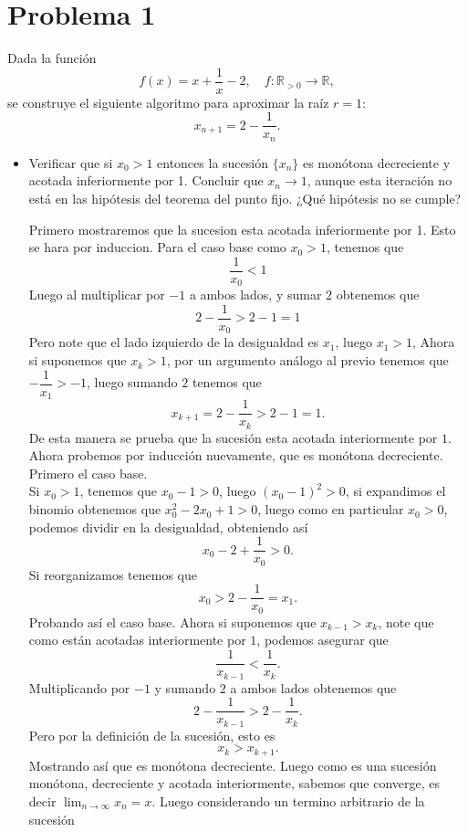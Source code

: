 
\section{Problema 1}
Dada la función
\[
f(x) = x + \frac{1}{x} - 2, \quad f: \mathbb{R}_{>0} \to \mathbb{R},
\]
se construye el siguiente algoritmo para aproximar la raíz $r = 1$:
\[
x_{n+1} = 2 - \frac{1}{x_n}.
\]

\begin{itemize}
    \item Verificar que si $x_0 > 1$ entonces la sucesión $\{x_n\}$ es monótona decreciente y acotada inferiormente por 1. Concluir que $x_n \to 1$, aunque esta iteración no está en las hipótesis del teorema del punto fijo. ¿Qué hipótesis no se cumple?
    \begin{sproof} Primero mostraremos que la sucesion esta acotada inferiormente por 1. Esto se hara por induccion. Para el caso base como $x_0>1$, tenemos que
    $$\frac{1}{x_0}<1$$
    Luego al multiplicar por $-1$ a ambos lados, y sumar $2$ obtenemos que
    $$2-\frac{1}{x_0}>2-1=1$$
    Pero note que el lado izquierdo de la desigualdad es $x_1$, luego $x_1>1$, Ahora si suponemos que $x_k>1$, por un argumento análogo al previo tenemos que $-\dfrac{1}{x_1}>-1$, luego sumando $2$ tenemos que
    $$x_{k+1}=2-\frac{1}{x_k}>2-1=1.$$
    De esta manera se prueba que la sucesión esta acotada interiormente por $1.$\\
    Ahora probemos por inducción nuevamente, que es monótona decreciente. Primero el caso base.\\
        Si $x_0>1$, tenemos que $x_0-1>0$, luego $(x_0-1)^2>0$, si expandimos el binomio obtenemos que $x_0^2-2x_0+1>0$, luego como en particular $x_0>0$, podemos dividir en la desigualdad, obteniendo así
        $$x_0-2+\frac{1}{x_0}>0.$$
        Si reorganizamos tenemos que
        $$x_0>2-\frac{1}{x_0}=x_1.$$
        Probando así el caso base. Ahora si suponemos que $x_{k-1}>x_k$, note que como están acotadas interiormente por $1$, podemos asegurar que
        $$\frac{1}{x_{k-1}}<\frac{1}{x_k}.$$
        Multiplicando por $-1$ y sumando $2$ a ambos lados obtenemos que
        $$2-\frac{1}{x_{k-1}}>2-\frac{1}{x_k}.$$
        Pero por la definición de la sucesión, esto es
        $$x_{k}>x_{k+1}.$$
        Mostrando así que es monótona decreciente. Luego como es una sucesión monótona, decreciente y acotada interiormente, sabemos que converge, es decir $\lim_{n\to\infty}x_n=x$. Luego considerando un termino arbitrario de la sucesión 

\end{sproof}
\end{itemize}
